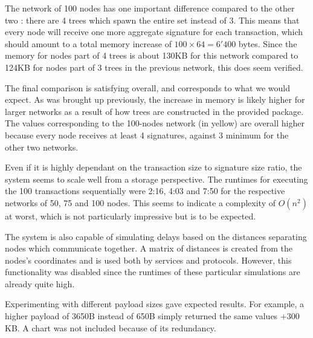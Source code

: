 \documentclass[11pt, a4paper, twoside, openright]{article}
\begin{document}
The network of 100 nodes has one important difference compared to the other two : there are 4 trees which spawn the entire set instead of 3. This means that every node will receive one more aggregate signature for each transaction, which should amount to a total memory increase of $100 \times 64 = 6'400$ bytes. Since the memory for nodes part of 4 trees is about 130KB for this network compared to 124KB for nodes part of 3 trees in the previous network, this does seem verified.

The final comparison is satisfying overall, and corresponds to what we would expect. As was brought up previously, the increase in memory is likely higher for larger networks as a result of how trees are constructed in the provided package. The values corresponding to the 100-nodes network (in yellow) are overall higher because every node receives at least 4 signatures, against 3 minimum for the other two networks. 

Even if it is highly dependant on the transaction size to signature size ratio, the system seems to scale well from a storage perspective. The runtimes for executing the 100 transactions sequentially were 2:16, 4:03 and 7:50 for the respective networks of 50, 75 and 100 nodes. This seems to indicate a complexity of $O(n^2)$ at worst, which is not particularly impressive but is to be expected.

The system is also capable of simulating delays based on the distances separating nodes which communicate together. A matrix of distances is created from the nodes's coordinates and is used both by services and protocols. However, this functionality was disabled since the runtimes of these particular simulations are already quite high.

Experimenting with different payload sizes gave expected results. For example, a higher payload of 3650B instead of 650B simply returned the same values  $+300$KB. A chart was not included because of its redundancy.
\end{document}
